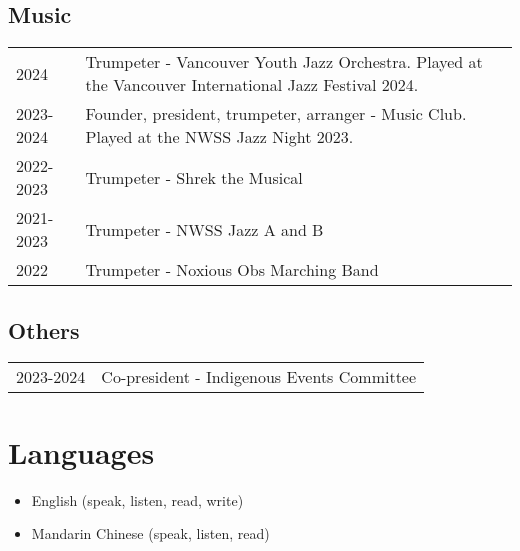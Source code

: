 \documentclass{article}
\begin{document}
\subsection*{Music}

\begin{tabular}{@{}ll}
	2024      & Trumpeter - Vancouver Youth Jazz Orchestra. Played at the Vancouver International Jazz Festival 2024. \\
	2023-2024 & Founder, president, trumpeter, arranger - Music Club. Played at the NWSS Jazz Night 2023.             \\
	2022-2023 & Trumpeter - Shrek the Musical                                                                         \\
	2021-2023 & Trumpeter - NWSS Jazz A and B                                                                         \\
	2022      & Trumpeter - Noxious Obs Marching Band
\end{tabular}

\subsection*{Others}

\begin{tabular}{@{}ll}
	2023-2024 & Co-president - Indigenous Events Committee
\end{tabular}

\section*{Languages}

\begin{itemize}
	\item English (speak, listen, read, write)
	\item Mandarin Chinese (speak, listen, read)
\end{itemize}
\end{document}
